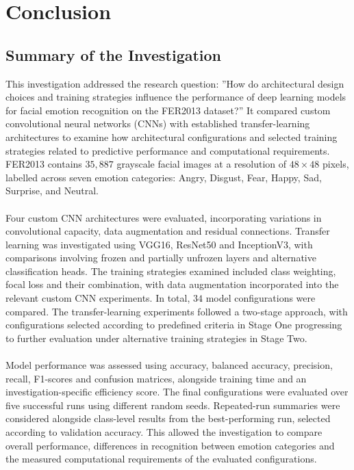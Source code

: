 \documentclass[12pt, a4paper]{report}
\let\oldsection\section
\renewcommand{\section}{%
    \Needspace{6\baselineskip}%
    \oldsection
}
\begin{document}
	
	\chapter{Conclusion}
		
		\section{Summary of the Investigation}
			
			This investigation addressed the research question: ''How do architectural design choices and training strategies influence the performance of deep learning models for facial emotion recognition on the FER2013 dataset?'' It compared custom convolutional neural networks (CNNs) with established transfer-learning architectures to examine how architectural configurations and selected training strategies related to predictive performance and computational requirements. FER2013 contains $35,887$ grayscale facial images at a resolution of $48\times48$ pixels, labelled across seven emotion categories: Angry, Disgust, Fear, Happy, Sad, Surprise, and Neutral.\\\\
			Four custom CNN architectures were evaluated, incorporating variations in convolutional capacity, data augmentation and residual connections. Transfer learning was investigated using VGG16, ResNet50 and InceptionV3, with comparisons involving frozen and partially unfrozen layers and alternative classification heads. The training strategies examined included class weighting, focal loss and their combination, with data augmentation incorporated into the relevant custom CNN experiments. In total, $34$ model configurations were compared. The transfer-learning experiments followed a two-stage approach, with configurations selected according to predefined criteria in Stage One progressing to further evaluation under alternative training strategies in Stage Two.\\\\
			Model performance was assessed using accuracy, balanced accuracy, precision, recall, F1-scores and confusion matrices, alongside training time and an investigation-specific efficiency score. The final configurations were evaluated over five successful runs using different random seeds. Repeated-run summaries were considered alongside class-level results from the best-performing run, selected according to validation accuracy. This allowed the investigation to compare overall performance, differences in recognition between emotion categories and the measured computational requirements of the evaluated configurations.
\end{document}
